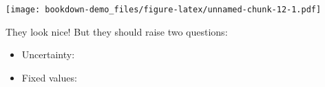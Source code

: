 \documentclass[]{book}
\newenvironment{Shaded}{\begin{snugshade}}{\end{snugshade}}
\newcommand{\KeywordTok}[1]{\textcolor[rgb]{0.13,0.29,0.53}{\textbf{#1}}}
\newcommand{\NormalTok}[1]{#1}
\newcommand{\OperatorTok}[1]{\textcolor[rgb]{0.81,0.36,0.00}{\textbf{#1}}}
\newcommand{\StringTok}[1]{\textcolor[rgb]{0.31,0.60,0.02}{#1}}
\begin{document}
\texttt{[image: bookdown-demo\_files/figure-latex/unnamed-chunk-12-1.pdf]}

They look nice! But they should raise two questions:

\begin{itemize}
\item
  Uncertainty:
\item
  Fixed values:
\end{itemize}

\begin{Shaded}
\end{Shaded}
\end{document}
